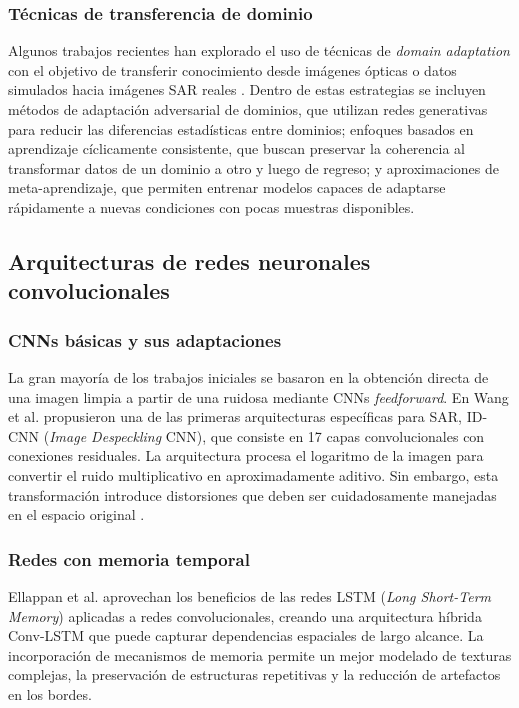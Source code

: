 \subsubsection{Técnicas de transferencia de dominio}

Algunos trabajos recientes han explorado el uso de técnicas de \emph{domain adaptation} con el objetivo de transferir conocimiento desde imágenes ópticas o datos simulados hacia imágenes SAR reales \cite{shi2022unsupervised}. Dentro de estas estrategias se incluyen métodos de adaptación adversarial de dominios, que utilizan redes generativas para reducir las diferencias estadísticas entre dominios; enfoques basados en aprendizaje cíclicamente consistente, que buscan preservar la coherencia al transformar datos de un dominio a otro y luego de regreso; y aproximaciones de meta-aprendizaje, que permiten entrenar modelos capaces de adaptarse rápidamente a nuevas condiciones con pocas muestras disponibles.

\subsection{Arquitecturas de redes neuronales convolucionales}

\subsubsection{CNNs básicas y sus adaptaciones}

La gran mayoría de los trabajos iniciales se basaron en la obtención directa de una imagen limpia a partir de una ruidosa mediante CNNs \emph{feedforward}. En Wang et al. \cite{wang2017sar} propusieron una de las primeras arquitecturas específicas para SAR, ID-CNN (\emph{Image Despeckling} CNN), que consiste en 17 capas convolucionales con conexiones residuales. La arquitectura procesa el logaritmo de la imagen para convertir el ruido multiplicativo en aproximadamente aditivo. Sin embargo, esta transformación introduce distorsiones que deben ser cuidadosamente manejadas en el espacio original \cite{deledalle2017mulog}.

\subsubsection{Redes con memoria temporal}

Ellappan et al. \cite{ellappan2021deep} aprovechan los beneficios de las redes LSTM (\emph{Long Short-Term Memory}) aplicadas a redes convolucionales, creando una arquitectura híbrida Conv-LSTM que puede capturar dependencias espaciales de largo alcance. La incorporación de mecanismos de memoria permite un mejor modelado de texturas complejas, la preservación de estructuras repetitivas y la reducción de artefactos en los bordes.

